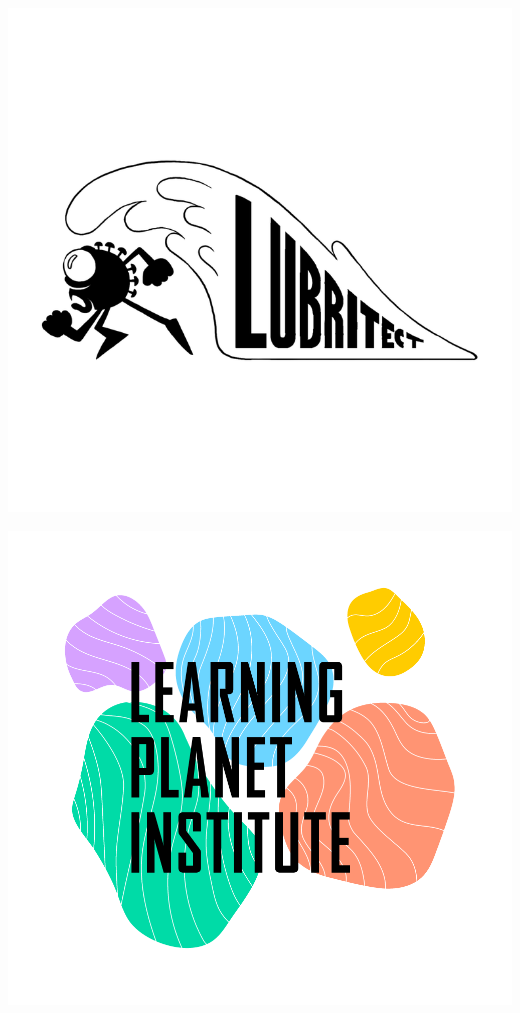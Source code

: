 \documentclass[11pt,a4paper]{article}
\begin{document}
\begin{titlepage}
\begin{minipage}{0.25\textwidth}
        \includegraphics[width=\linewidth]{Logos/project_logo.png}\par\vspace{1cm}
        \includegraphics[width=\linewidth]{Logos/Copie de LPI_LOGO_RVB.png}\par\vspace{1cm}

\end{minipage}
\end{titlepage}
\end{document}
